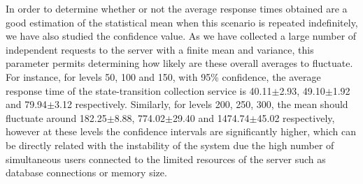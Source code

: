 	

	In order to determine whether or not the average response times obtained are a good estimation of the statistical mean when this scenario is repeated indefinitely, we have also studied the confidence value. As we have collected a large number of independent requests to the server with a finite mean and variance, this parameter permits determining how likely are these overall averages to fluctuate. For instance, for levels 50, 100 and 150, with 95\% confidence, the average response time of the state-transition collection service is 40.11$\pm$2.93, 49.10$\pm$1.92 and 79.94$\pm$3.12 respectively. Similarly, for levels 200, 250, 300, the mean should fluctuate around 182.25$\pm$8.88, 774.02$\pm$29.40 and 1474.74$\pm$45.02 respectively, however at these levels the confidence intervals are significantly higher, which can be directly related with the instability of the system due the high number of simultaneous users connected to the limited resources of the server such as database connections or memory size.
